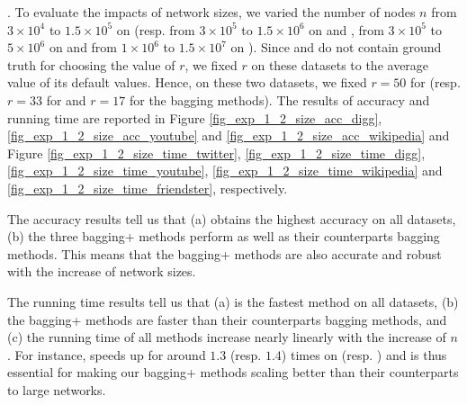 . To evaluate the impacts of network sizes, we varied the
number of nodes $n$ from $3\times 10^4$ to $1.5\times 10^5$ on \Digg (resp.
from $3\times 10^5$ to $1.5\times 10^6$ on \YouTube and \Wikipedia,
from $3\times 10^5$ to $5\times 10^6$ on \Twitter and
from $1\times 10^6$ to $1.5\times 10^7$ on \Friendster).
Since \Twitter and \Friendster do not contain ground truth for choosing the value of $r$,
we fixed $r$ on these datasets to the average value of
its default values. Hence, on these two datasets, we fixed $r = 50$ for \NMF
(resp. $r = 33$ for \BIGCLAM and $r = 17$ for the bagging methods). The results
of accuracy and running time are reported in Figure \ref{fig_exp_1_2_size_acc_digg},
\ref{fig_exp_1_2_size_acc_youtube} and \ref{fig_exp_1_2_size_acc_wikipedia}
and Figure \ref{fig_exp_1_2_size_time_twitter}, \ref{fig_exp_1_2_size_time_digg},
\ref{fig_exp_1_2_size_time_youtube}, \ref{fig_exp_1_2_size_time_wikipedia} and
\ref{fig_exp_1_2_size_time_friendster}, respectively.



The accuracy results tell us that (a) \Biased obtains the highest accuracy on all
datasets, (b) the three bagging+ methods perform as well as their counterparts
bagging methods. This means that the bagging+ methods are also accurate and
robust with the increase of network sizes.

The running time results tell us that (a) \Biasedp is the fastest method on all
datasets, (b) the bagging+ methods are faster than their counterparts bagging
methods, and (c) the running time of all methods increase nearly linearly with the
increase of $n$. For instance, \Biasedp speeds up \Biased for around
$1.3$ (resp. $1.4$) times on \Twitter (resp. \Friendster) and is thus essential for
making our bagging+ methods scaling better than their counterparts to large networks.



